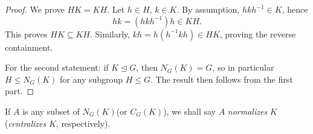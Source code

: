 \begin{proof}
    We prove \( HK = KH \). Let \( h \in H \), \( k \in K \). By assumption, \( hkh^{-1} \in K \), hence
    \[
    hk = (hkh^{-1})h \in KH.
    \]
    This proves \( HK \subseteq KH \). Similarly, \( kh = h(h^{-1}kh) \in HK \), proving the reverse containment. 
    
    For the second statement: if \( K \trianglelefteq G \), then \( N_G(K) = G \), so in particular \( H \leq N_G(K) \)
    for any subgroup \( H \leq G \). The result then follows from the first part.
\end{proof}

\begin{definition}
    If $A$ is any subset of $N_G(K)$(or $C_G(K)$), we shall say $A$ \textit{normalizes} $K$(\textit{centralizes} $K$, respectively). 
\end{definition}